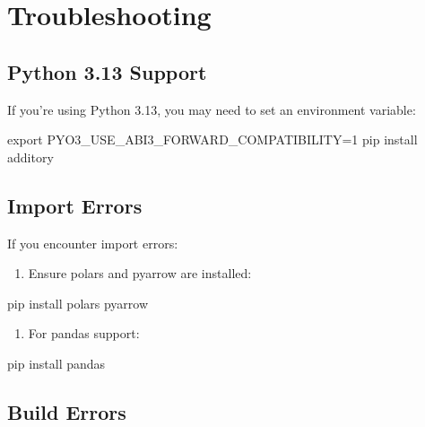 \documentclass[
  letterpaper,
]{scrbook}
\newenvironment{Shaded}{\begin{snugshade}}{\end{snugshade}}
\newcommand{\BuiltInTok}[1]{\textcolor[rgb]{0.00,0.23,0.31}{#1}}
\newcommand{\ExtensionTok}[1]{\textcolor[rgb]{0.00,0.23,0.31}{#1}}
\newcommand{\NormalTok}[1]{\textcolor[rgb]{0.00,0.23,0.31}{#1}}
\newcommand{\OperatorTok}[1]{\textcolor[rgb]{0.37,0.37,0.37}{#1}}
\newcommand{\VariableTok}[1]{\textcolor[rgb]{0.07,0.07,0.07}{#1}}
\providecommand{\tightlist}{%
  \setlength{\itemsep}{0pt}\setlength{\parskip}{0pt}}
\begin{document}
\section{Troubleshooting}\label{troubleshooting}

\subsection{Python 3.13 Support}\label{python-3.13-support}

If you're using Python 3.13, you may need to set an environment
variable:

\begin{Shaded}
\begin{Highlighting}[]
\BuiltInTok{export} \VariableTok{PYO3\_USE\_ABI3\_FORWARD\_COMPATIBILITY}\OperatorTok{=}\NormalTok{1}
\ExtensionTok{pip}\NormalTok{ install additory}
\end{Highlighting}
\end{Shaded}

\subsection{Import Errors}\label{import-errors}

If you encounter import errors:

\begin{enumerate}
\def\labelenumi{\arabic{enumi}.}
\tightlist
\item
  Ensure polars and pyarrow are installed:
\end{enumerate}

\begin{Shaded}
\begin{Highlighting}[]
\ExtensionTok{pip}\NormalTok{ install polars pyarrow}
\end{Highlighting}
\end{Shaded}

\begin{enumerate}
\def\labelenumi{\arabic{enumi}.}
\setcounter{enumi}{1}
\tightlist
\item
  For pandas support:
\end{enumerate}

\begin{Shaded}
\begin{Highlighting}[]
\ExtensionTok{pip}\NormalTok{ install pandas}
\end{Highlighting}
\end{Shaded}

\subsection{Build Errors}\label{build-errors}
\end{document}
